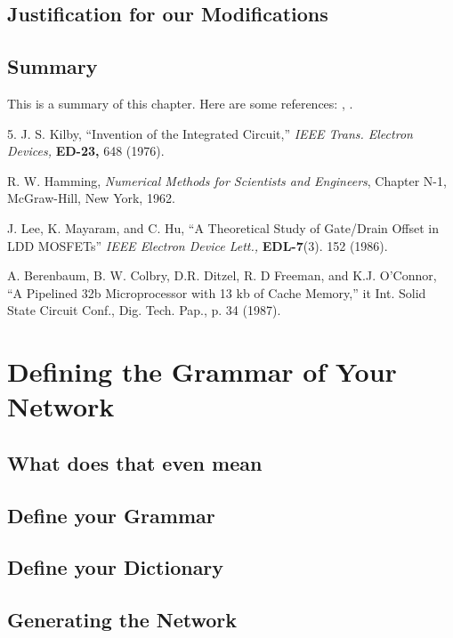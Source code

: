 \documentclass{wileySev}
\begin{document}
\section{Justification for our Modifications}

\section{Summary}
This is a summary of this chapter.
Here are some references: \cite{xkilby}, \cite{xberen}.

\begin{chapreferences}{5.}
J. S. Kilby,
``Invention of the Integrated Circuit,'' {\it IEEE Trans. Electron Devices,}
{\bf ED-23,} 648 (1976).


R. W. Hamming,
                 {\it Numerical Methods for Scientists and 
                 Engineers}, Chapter N-1, McGraw-Hill, 
                 New York, 1962.

J. Lee, K. Mayaram, and C. Hu, ``A Theoretical
               Study of Gate/Drain Offset in LDD MOSFETs''
                     {\it IEEE Electron Device Lett.,} {\bf EDL-7}(3). 152 
                     (1986).

A. Berenbaum, 
B. W. Colbry, D.R. Ditzel, R. D Freeman, and 
K.J. O'Connor, ``A Pipelined 32b Microprocessor with 13 kb of Cache Memory,''
{it Int. Solid State Circuit Conf., Dig. Tech. Pap.,} p. 34 (1987).
\end{chapreferences}

\chapter{Defining the Grammar of Your Network}
\section{What does that even mean}
\section{Define your Grammar}
\section{Define your Dictionary}
\section{Generating the Network}
\end{document}
